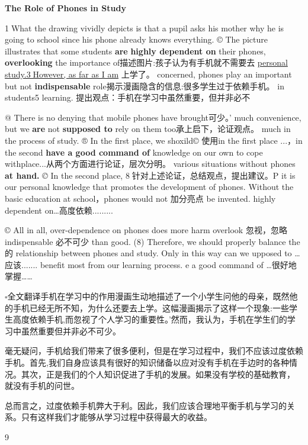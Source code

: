 \documentclass[UTF8,11pt]{ctexart}
\begin{document}
  \textbf{The Role of Phones in Study}


\textcircled{1}What the drawing vividly depicts is that a pupil asks his mother why he is going to school since his phone already knows everything. © The picture illustrates that some students\textbf{ are} \textbf{highly dependent on} their phones,\textbf{ overlooking} the importance of描述图片:孩子认为有手机就不需要去 \uline{personal study.\textcircled{3}However, as far as I am} 上学了。 concerned, phones play an important but not\textbf{ indispensable} role揭示漫画隐含的信息:很多学生过于依赖手机。 in students5 learning. 提出观点：手机在学习中虽然重要，但并非必不


@ There is no denying that mobile phones have brought可少。' much convenience, but we\textbf{ are} not\textbf{ supposed to} rely on them too承上启下，论证观点。 much in the process of study. ® In the first place, we shoxild© 使用in the first place ...，in the second \textbf{have a good command of} knowledge on our own to cope withplace...从两个方面进行论证，层次分明。 various situations without phones\textbf{ at hand.}\textit{ ©} In the second place, \textcircled{8}针对上述论证，总结观点，提出建议。P it is our personal knowledge that promotes the development of phones. Without the basic education at school，phones would not 加分亮点 be invented. highly dependent on…高度依赖.........


© All in all, over-dependence on phones does more harm overlook 忽视，忽略indispensable 必不可少 than good. (8) Therefore, we should properly balance the 的 relationship between phones and study. Only in this way can we upposed to …应该....... benefit most from our learning process. e a good command of …很好地掌握…… 


\(\square\)全文翻译手机在学习中的作用漫画生动地描述了一个小学生问他的母亲，既然他的手机已经无所不知，为什么还要去上学。这幅漫画揭示了这样一个现象:一些学生高度依赖手机,而忽视了个人学习的重要性。'然而，我认为，手机在学生们的学习中虽然重要但并非必不可少。


毫无疑问，手机给我们带来了很多便利，但是在学习过程中，我们不应该过度依赖手机。首先,我们自身应该具有很好的知识储备以应对没有手机在手边时的各种情况。其次，正是我们的个人知识促进了手机的发展。如果没有学校的基础教育， 就没有手机的问世。


总而言之，过度依赖手机弊大于利。因此，我们应该合理地平衡手机与学习的关系。只有这样我们才能够从学习过程中获得最大的收益。


9
\end{document}
